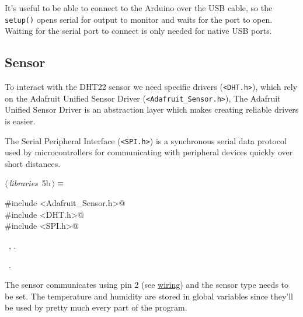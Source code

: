 \documentclass[a4paper, 11pt]{article}
\begin{document}
It's useful to be able to connect to the Arduino over the USB cable,
so the \verb|setup()| opens serial for output to monitor and waits for the port to open.
Waiting for the serial port to connect is only needed for native USB ports.

\subsection{Sensor}

To interact with the DHT22 sensor we need specific drivers (\verb|<DHT.h>|),
which rely on the Adafruit Unified Sensor Driver (\verb|<Adafruit_Sensor.h>|),
The Adafruit Unified Sensor Driver is an abstraction layer
which makes creating reliable drivers is easier. 

The Serial Peripheral Interface (\verb|<SPI.h>|) is a synchronous serial data protocol
used by microcontrollers for communicating with peripheral devices quickly over short distances.

\begin{flushleft} \small
\begin{minipage}{\linewidth}\label{scrap2}\raggedright\small
{}$\langle\,${\itshape libraries}\nobreak\ {\footnotesize{5b}}$\,\rangle\equiv$
\vspace{-1ex}
\begin{list}{}{\setlength{\leftmargin}{1em}} \item
\mbox{}\lstinline@#include <Adafruit_Sensor.h>@\\
\mbox{}\lstinline@#include <DHT.h>@\\
\mbox{}\lstinline@#include <SPI.h>@\\
\mbox{}{\NWsep}
\end{list}
\vspace{-1ex}
\vspace{-1ex}
\footnotesize
\begin{list}{}{\setlength{\itemsep}{-\parsep}\setlength{\itemindent}{-\leftmargin}}
\item \NWtxtMacroDefBy\ , .
\item \NWtxtMacroRefIn\ .
\end{list}
\end{minipage}
\end{flushleft}

The sensor communicates using pin 2 (see \hyperref[sec:wiring]{wiring})
and
the sensor type needs to be set.
The temperature and humidity
are stored in global variables
since they'll be used by pretty much every part of the program.
\end{document}
